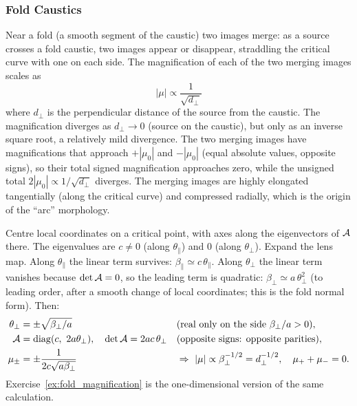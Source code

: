 \subsubsection{Fold Caustics}

Near a fold (a smooth segment of the caustic) two images merge: as a
source crosses a fold caustic, two images appear or disappear,
straddling the critical curve with one on each side.  The
magnification of each of the two merging images scales as
\begin{equation}
    \boxed{
    |\mu| \propto \frac{1}{\sqrt{d_{\perp}}}
    }
    \label{eq:fold_magnification}
\end{equation}
where $d_\perp$ is the perpendicular distance of the source from the
caustic.  The magnification diverges as $d_\perp \to 0$ (source on
the caustic), but only as an inverse square root, a relatively mild
divergence.  The two merging images have magnifications that
approach $+|\mu_0|$ and $-|\mu_0|$ (equal absolute values, opposite
signs), so their total signed magnification approaches zero, while
the unsigned total $2|\mu_0| \propto 1/\sqrt{d_\perp}$ diverges.
The merging images are highly elongated tangentially (along the
critical curve) and compressed radially, which is the origin of the
``arc'' morphology.

\begin{derivation}
Centre local coordinates on a critical point, with axes along the
eigenvectors of $\mathcal{A}$ there.  The eigenvalues are $c \ne 0$ (along
$\theta_\parallel$) and $0$ (along $\theta_\perp$).  Expand the lens map.
Along $\theta_\parallel$ the linear term survives: $\beta_\parallel \simeq
c\,\theta_\parallel$.  Along $\theta_\perp$ the linear term vanishes because
$\det\mathcal{A} = 0$, so the leading term is quadratic: $\beta_\perp \simeq
a\,\theta_\perp^2$ (to leading order, after a smooth change of local
coordinates; this is the fold normal form).
Then:
\begin{align*}
  \theta_\perp &= \pm\sqrt{\beta_\perp/a}
  && \text{(real only on the side } \beta_\perp/a > 0\text{)},\\
  \mathcal{A} &= \mathrm{diag}(c,\ 2a\theta_\perp),\quad
  \det\mathcal{A} = 2ac\,\theta_\perp
  && \text{(opposite signs: opposite parities)},\\
  \mu_\pm &= \pm\frac{1}{2c\sqrt{a\beta_\perp}}
  && \Rightarrow\ |\mu| \propto \beta_\perp^{-1/2} = d_\perp^{-1/2},
  \quad \mu_+ + \mu_- = 0 .
\end{align*}
Exercise~\ref{ex:fold_magnification} is the one-dimensional version of the
same calculation.
\end{derivation}


